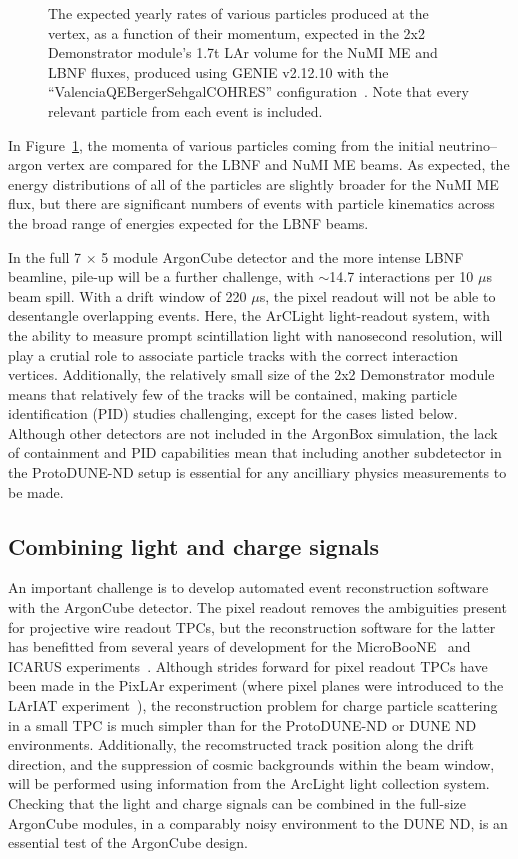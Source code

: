 \begin{figure}[htb]
  \caption{The expected yearly rates of various particles produced at the vertex, as a function of their momentum, expected in the 2x2 Demonstrator module's 1.7t LAr volume for the NuMI ME and LBNF fluxes, produced using GENIE v2.12.10 with the ``ValenciaQEBergerSehgalCOHRES'' configuration~\cite{genie}. Note that every relevant particle from each event is included.}
  \label{fig:momenta}
\end{figure}
In Figure~\ref{fig:momenta}, the momenta of various particles coming from the initial neutrino--argon vertex are compared for the LBNF and NuMI ME beams. As expected, the energy distributions of all of the particles are slightly broader for the NuMI ME flux, but there are significant numbers of events with particle kinematics across the broad range of energies expected for the LBNF beams.

In the full 7 $\times$ 5 module ArgonCube detector and the more intense LBNF beamline, pile-up will be a further challenge, with $\sim$14.7 interactions per 10 $\mu$s beam spill. With a drift window of 220 $\mu$s, the pixel readout will not be able to desentangle overlapping events. Here, the ArCLight light-readout system, with the ability to measure prompt scintillation light with nanosecond resolution, will play a crutial role to associate particle tracks with the correct interaction vertices. Additionally, the relatively small size of the 2x2 Demonstrator module means that relatively few of the tracks will be contained, making particle identification (PID) studies challenging, except for the cases listed below. Although other detectors are not included in the ArgonBox simulation, the lack of containment and PID capabilities mean that including another subdetector in the ProtoDUNE-ND setup is essential for any ancilliary physics measurements to be made.

\FloatBarrier
\subsection{Combining light and charge signals}
An important challenge is to develop automated event reconstruction software with the ArgonCube detector. The pixel readout removes the ambiguities present for projective wire readout TPCs, but the reconstruction software for the latter has benefitted from several years of development for the MicroBooNE~\cite{microboone} and ICARUS experiments~\cite{icarus}. Although strides forward for pixel readout TPCs have been made in the PixLAr experiment (where pixel planes were introduced to the LArIAT experiment~\cite{lariat}), the reconstruction problem for charge particle scattering in a small TPC is much simpler than for the ProtoDUNE-ND or DUNE ND environments. Additionally, the recomstructed track position along the drift direction, and the suppression of cosmic backgrounds within the beam window, will be performed using information from the ArcLight light collection system. Checking that the light and charge signals can be combined in the full-size ArgonCube modules, in a comparably noisy environment to the DUNE ND, is an essential test of the ArgonCube design.


